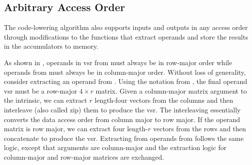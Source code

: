 \documentclass[\main/thesis.tex]{subfiles}
\begin{document}
\subsection{Arbitrary Access Order}
\label{sec:arbitraryOrder}
The code-lowering algorithm also supports inputs and outputs in any access order through modifications to the functions that extract operands and store the results in the accumulators to memory.

As shown in , operands in \gls{vsr} from  must always be in row-major order while operands from  must always be in column-major order.
Without loss of generality, consider extracting an operand from .
Using the notation from , the final operand \gls{vsr} must be a row-major $4 \times r$ matrix.
Given a column-major matrix argument to the intrinsic, we can extract $r$ length-four vectors from the columns and then interleave (also called zip) them to produce the \gls{vsr}.
The interleaving essentially converts the data access order from column major to row major.
If the operand matrix is row major, we can extract four length-$r$ vectors from the rows and then concatenate to produce the \gls{vsr}.
Extracting from operands from  follows the same logic, except that arguments are column-major and the extraction logic for column-major and row-major matrices are exchanged.
\end{document}
